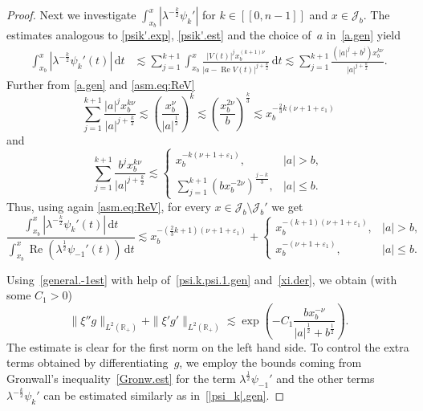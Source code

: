 \begin{proof}
Next we investigate $\int_{x_b}^x|\lambda^{-\frac k2} \psi_k'|$ for $k \in [[0,n-1]]$ and $x \in {\mathcal J}_b$.
The estimates analogous to \eqref{psik'.exp}, \eqref{psik'.est} 
and the choice of~$a$ in~\eqref{a.gen} yield
\begin{equation}\label{|psi_k|.gen}
\begin{aligned}
\int_{x_b}^x
|\lambda^{-\frac k2} \psi_k'(t)| \, {\mathrm{d}} t 
&{\lesssim} 
\sum_{j=1}^{k+1}
\int_{x_b}^x
\frac{|V(t)|^j x_b^{(k+1)\nu}}{ |a-{\operatorname{Re}} V(t)|^{j + \frac k2}}
\, {\mathrm{d}} t 
{\lesssim} 
\sum_{j=1}^{k+1}
\frac{(|a|^j + b^j)x_b^{k \nu}}{ |a|^{j + \frac k2}}.
\end{aligned}
\end{equation}
Further from \eqref{a.gen} and \eqref{asm.eq:ReV}
\begin{equation}
\sum_{j=1}^{k+1}
\frac{|a|^j x_b^{k \nu}}{ |a|^{j + \frac k2}}
{\lesssim}
\left(\frac{x_b^{\nu}}{ |a|^\frac1 2}\right)^k
{\lesssim}
\left(\frac{x_b^{2\nu}}{b}\right)^\frac k3
{\lesssim}
x_b^{-\frac2 3k (\nu +1 + {\varepsilon}_1)}
\end{equation}
and
\begin{equation}
\sum_{j=1}^{k+1}
\frac{b^j x_b^{k \nu}}{ |a|^{j + \frac k2}}
{\lesssim}
\begin{cases}
x_b^{-k(\nu+1+{\varepsilon}_1)}, & |a|>b,
\\[1mm]
\sum_{j=1}^{k+1} \left(b x_b^{-2\nu} \right)^\frac{j-k}3, & |a| \leq b.
\end{cases}
\end{equation}
Thus, using again \eqref{asm.eq:ReV}, 
for every $x \in {\mathcal J}_b \setminus {\mathcal J}_b'$ we get
\begin{equation}\label{psi.k.psi.1.gen}
\frac{\int_{x_b}^x|\lambda^{-\frac k2} \psi_k'(t)| \, {\mathrm{d}} t}{\int_{x_b}^x{\operatorname{Re}} (\lambda^\frac 12 \psi_{-1}'(t)) \, {\mathrm{d}} t}
{\lesssim} 
x_b^{-(\frac2 3k+1) (\nu +1 + {\varepsilon}_1)}
+
\begin{cases}
x_b^{-(k+1)(\nu+1+{\varepsilon}_1)}, & |a|>b,
\\[1mm]
x_b^{-(\nu+1+{\varepsilon}_1)}, & |a| \leq b.
\end{cases}
\end{equation}

Using~\eqref{general.-1est} with help of~\eqref{psi.k.psi.1.gen}
and~\eqref{xi.der},
we obtain (with some $C_1>0$)
\begin{equation}\label{xi'g.gen}
\|\xi'' g\|_{L^2({\mathbb{R}}_+)} + \|\xi' g'\|_{L^2({\mathbb{R}}_+)} 
{\lesssim} 
\exp \left(- C_1 \frac{b x_b^{-\nu}}{|a|^\frac12 + b^\frac 12} \right).
\end{equation}
The estimate is clear for the first norm on the left hand side.
To control the extra terms obtained by differentiating~$g$,
we employ the bounds coming from Gronwall's inequality~\eqref{Gronw.est}
for the term $\lambda^\frac{1}{2} \psi_{-1}'$
and the other terms $\lambda^{-\frac{k}{2}} \psi_k'$ 
can be estimated similarly as in~\eqref{|psi_k|.gen}.


\end{proof}

